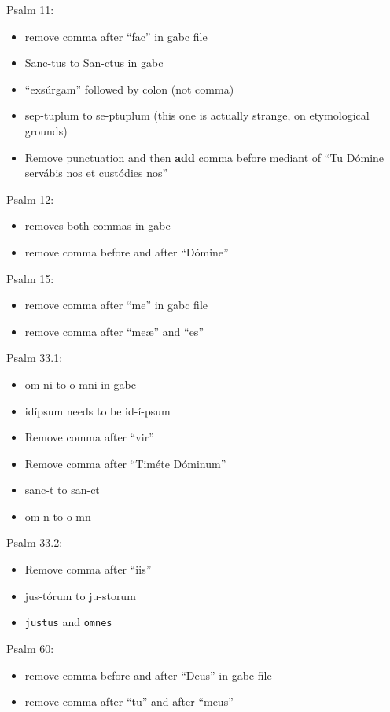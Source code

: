 \documentclass[11pt]{article}
\begin{document}
Psalm 11:
  \begin{itemize}
  \item remove comma after ``fac'' in gabc file 
  \item  Sanc-tus to San-ctus in gabc
\item ``exsúrgam'' followed by colon (not comma)
\item
sep-tuplum to se-ptuplum (this one is actually strange, on etymological grounds)
\item
Remove punctuation and then \textbf{add} comma before mediant of ``Tu Dómine servábis nos et custódies nos''
    \end{itemize}

Psalm 12:
  \begin{itemize}
  \item removes both commas in gabc
  \item  remove comma before and after ``Dómine''
    \end{itemize}

Psalm 15:
  \begin{itemize}
  \item remove comma after ``me'' in gabc file
  \item  remove comma after ``meæ'' and ``es''
    \end{itemize}

Psalm 33.1:
  \begin{itemize}
  \item om-ni to o-mni in gabc
  \item idípsum needs to be id-í-psum
    \item
  Remove comma after ``vir''
  \item
  Remove comma after ``Timéte Dóminum''
  \item
  sanc-t to san-ct
  \item
  om-n to o-mn
    \end{itemize}

Psalm 33.2:
  \begin{itemize}
    \item
  Remove comma after ``iis''
  \item
  jus-tórum to ju-storum
  \item  \verb|justus| and \verb|omnes|
    \end{itemize}

Psalm 60:
  \begin{itemize}
  \item remove comma before and after ``Deus'' in gabc file
  \item  remove comma after ``tu'' and after ``meus''
    \end{itemize}
\end{document}
